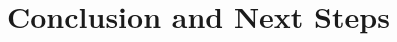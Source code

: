 \documentclass[11pt]{beamer}
\begin{document}




\section{Conclusion and Next Steps}
\end{document}
